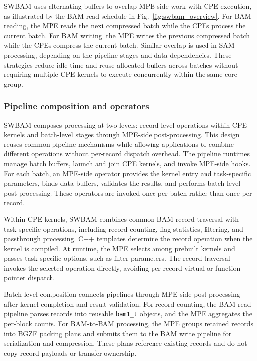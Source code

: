 \documentclass[lettersize,journal]{IEEEtran}
\begin{document}
SWBAM uses alternating buffers to overlap MPE-side work with CPE execution, as illustrated by the BAM read schedule in Fig.~\ref{fig:swbam_overview}.
For BAM reading, the MPE reads the next compressed batch while the CPEs process the current batch.
For BAM writing, the MPE writes the previous compressed batch while the CPEs compress the current batch.
Similar overlap is used in SAM processing, depending on the pipeline stages and data dependencies.
These strategies reduce idle time and reuse allocated buffers across batches without requiring multiple CPE kernels to execute concurrently within the same core group.

\subsubsection{Pipeline composition and operators}
SWBAM composes processing at two levels: record-level operations within CPE kernels and batch-level stages through MPE-side post-processing.
This design reuses common pipeline mechanisms while allowing applications to combine different operations without per-record dispatch overhead.
The pipeline runtimes manage batch buffers, launch and join CPE kernels, and invoke MPE-side hooks.
For each batch, an MPE-side operator provides the kernel entry and task-specific parameters, binds data buffers, validates the results, and performs batch-level post-processing.
These operators are invoked once per batch rather than once per record.

Within CPE kernels, SWBAM combines common BAM record traversal with task-specific operations, including record counting, flag statistics, filtering, and passthrough processing.
C++ templates determine the record operation when the kernel is compiled.
At runtime, the MPE selects among prebuilt kernels and passes task-specific options, such as filter parameters.
The record traversal invokes the selected operation directly, avoiding per-record virtual or function-pointer dispatch.

Batch-level composition connects pipelines through MPE-side post-processing after kernel completion and result validation.
For record counting, the BAM read pipeline parses records into reusable \texttt{bam1\_t} objects, and the MPE aggregates the per-block counts.
For BAM-to-BAM processing, the MPE groups retained records into BGZF packing plans and submits them to the BAM write pipeline for serialization and compression.
These plans reference existing records and do not copy record payloads or transfer ownership.
\end{document}
